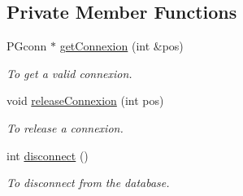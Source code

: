 \subsection*{Private Member Functions}
\begin{DoxyCompactItemize}
\item 
PGconn $\ast$ \hyperlink{classPOSTGREDatabase_adbea0ea18a50130d51b68dbaa86c1e89}{getConnexion} (int \&pos)
\begin{DoxyCompactList}\small\item\em To get a valid connexion. \item\end{DoxyCompactList}\item 
void \hyperlink{classPOSTGREDatabase_a6bc07c4256ea310f59b85bfc5803a340}{releaseConnexion} (int pos)
\begin{DoxyCompactList}\small\item\em To release a connexion. \item\end{DoxyCompactList}\item 
int \hyperlink{classPOSTGREDatabase_af026bcf159590b97226d829bddb8e00a}{disconnect} ()
\begin{DoxyCompactList}\small\item\em To disconnect from the database. \item\end{DoxyCompactList}\end{DoxyCompactItemize}

